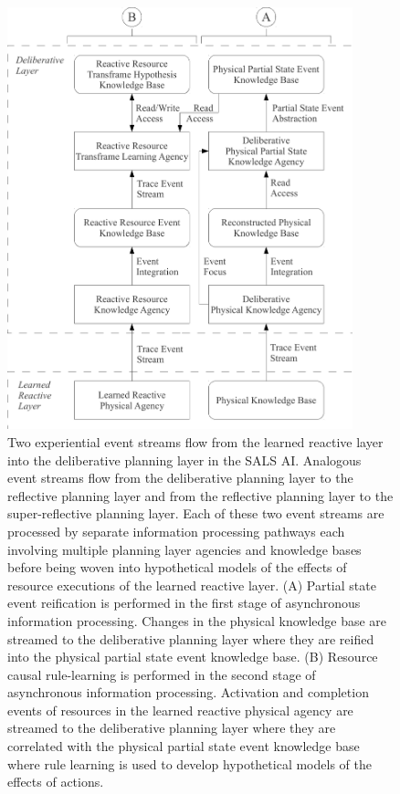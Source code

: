 \begin{figure}
\centering
\includegraphics[width=10cm]{gfx/deliberative_two_experiential_event_streams}
\caption[Two experiential event streams flow from the learned reactive
  layer into the deliberative planning layer in the SALS AI.]{Two
  experiential event streams flow from the learned reactive layer into
  the deliberative planning layer in the SALS AI.  Analogous event
  streams flow from the deliberative planning layer to the reflective
  planning layer and from the reflective planning layer to the
  super-reflective planning layer.  Each of these two event streams
  are processed by separate information processing pathways each
  involving multiple planning layer agencies and knowledge bases
  before being woven into hypothetical models of the effects of
  resource executions of the learned reactive layer.  (A) Partial
  state event reification is performed in the first stage of
  asynchronous information processing.  Changes in the physical
  knowledge base are streamed to the deliberative planning layer where
  they are reified into the physical partial state event knowledge
  base.  (B) Resource causal rule-learning is performed in the second
  stage of asynchronous information processing.  Activation and
  completion events of resources in the learned reactive physical
  agency are streamed to the deliberative planning layer where they
  are correlated with the physical partial state event knowledge base
  where rule learning is used to develop hypothetical models of the
  effects of actions.}
\label{figure:deliberative_two_experiential_event_streams}
\end{figure}
